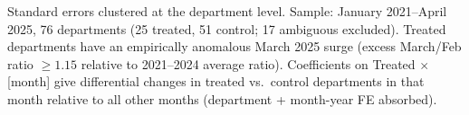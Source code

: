 \begin{table}[htbp]
   \par \raggedright
   Standard errors clustered at the department level. Sample: January 2021--April 2025, 76 departments (25 treated, 51 control; 17 ambiguous excluded). Treated departments have an empirically anomalous March 2025 surge (excess March/Feb ratio $\geq 1.15$ relative to 2021--2024 average ratio). Coefficients on Treated $\times$ [month] give differential changes in treated vs.~control departments in that month relative to all other months (department + month-year FE absorbed).
\end{table}
